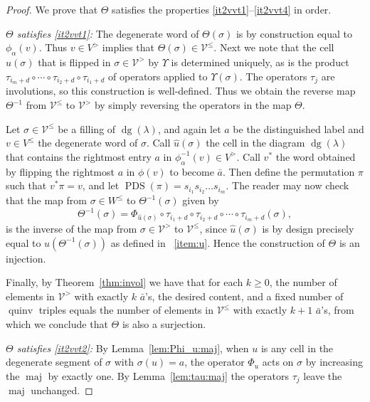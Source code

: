 \documentclass[ALCO,Unicode]{cedram}
\DeclareMathOperator{\PDS}{PDS}
\DeclareMathOperator{\dg}{dg}
\DeclareMathOperator{\maj}{maj}
\DeclareMathOperator{\quinv}{quinv}
\begin{document}
\begin{proof}
We prove that $\Theta$ satisfies the properties \ref{it2vvt1}--\ref{it2vvt4} in order. 

\emph{$\Theta$ satisfies \ref{it2vvt1}:} The degenerate word of $\Theta(\sigma)$ is by construction equal to $\phi_\alpha(v)$. Thus $v\in V^{>}$ implies that $\Theta(\sigma)\in \mathcal{V}^{\leq}$. Next we note that the cell $u(\sigma)$ that is flipped in $\sigma\in \mathcal{V}^{>}$ by $\Upsilon$ is determined uniquely, as is the product $ \tau_{i_m+d}\circ\cdots\circ \tau_{i_2+d} \circ \tau_{i_1+d}$ of operators applied to $\Upsilon(\sigma)$. The operators $\tau_j$ are involutions, so this construction is well-defined. Thus we obtain the reverse map $\Theta^{-1}$ from $\mathcal{V}^{\leq}$ to $\mathcal{V}^{>}$ by simply reversing the operators in the map $\Theta$. 

Let $\sigma\in \mathcal{V}^{\leq}$ be a filling of $\dg(\lambda)$, and again let $a$ be the distinguished label and $v\in V^{\leq}$ the degenerate word of $\sigma$. Call $\widehat{u}(\sigma)$ the cell in the diagram $\dg(\lambda)$ that contains the rightmost entry $a$ in $\phi^{-1}_\alpha(v)\in V^>$. Call $v^{\ast}$ the word obtained by flipping the rightmost $a$ in $\phi(v)$ to become $\bar{a}$. Then define the permutation $\pi$ such that $v^{\ast}\pi=v$, and let $\PDS(\pi)=s_{i_1}s_{i_2}\ldots s_{i_m}$. The reader may now check that the map from $\sigma\in W^{\leq}$ to $\Theta^{-1}(\sigma)$ given by
\[
\Theta^{-1}(\sigma) = \Phi_{\widehat{u}(\sigma)}\circ \tau_{i_1+d}\circ \tau_{i_2+d} \circ\cdots\circ \tau_{i_m+d}(\sigma),
\]
is the inverse of the map from $\sigma\in \mathcal{V}^{>}$ to $\mathcal{V}^{\leq}$, since $\widehat{u}(\sigma)$ is by design precisely equal to $u(\Theta^{-1}(\sigma))$ as defined in ~\ref{item:u}. Hence the construction of $\Theta$ is an injection.

Finally, by Theorem~\ref{thm:invol} we have that for each $k\geq 0$, the number of elements in $\mathcal{V}^{>}$ with exactly $k$ $\bar{a}$'s, the desired content, and a fixed number of $\quinv$ triples equals the number of elements in $\mathcal{V}^{\leq}$ with exactly $k+1$ $\bar{a}$'s, from which we conclude that $\Theta$ is also a surjection.

\emph{$\Theta$ satisfies \ref{it2vvt2}:}
By Lemma~\ref{lem:Phi_u:maj}, when $u$ is any cell in the degenerate segment of $\sigma$ with $\sigma(u)=a$, the operator $\Phi_u$ acts on $\sigma$ by increasing the $\maj$ by exactly one. By Lemma~\ref{lem:tau:maj} the operators $\tau_j$ leave the $\maj$ unchanged.


\end{proof}
\end{document}
